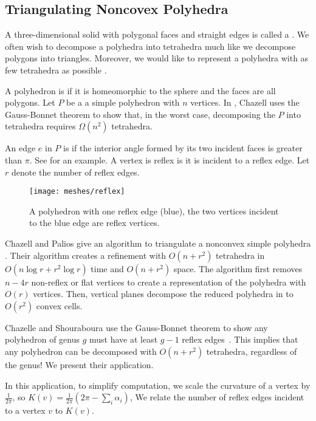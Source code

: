 \subsection{Triangulating Noncovex Polyhedra}
\label{sec:triangulating}

A three-dimensional solid with polygonal faces and straight edges is called a . 
We often wish to decompose a polyhedra into tetrahedra much like
we decompose polygons into triangles.
Moreover, we would like to represent a polyhedra
with as few tetrahedra as possible \cite{simplify-mesh-1999}.

A polyhedron is  if it is homeomorphic to the sphere 
and the faces are all polygons.
Let $P$ be a a simple polyhedron with $n$  vertices.
In \cite{chazelle-lower-1984}, Chazell uses the Gauss-Bonnet
theorem to show that,
in the worst case, decomposing the $P$
 into tetrahedra requires $\Omega(n^2)$ tetrahedra.

 An edge $e$ in $P$ is
 if the interior angle formed by its two incident faces
is greater than $\pi$. See  for an example.
A vertex is reflex is it is incident to a reflex edge.
Let $r$ denote the number of reflex edges.


\begin{figure}[htb]
\centering
	\texttt{[image: meshes/reflex]}
	\caption{A polyhedron with one reflex edge (blue), the two vertices incident to the blue
	edge are reflex vertices.}
\label{fig:reflex}
\end{figure}

Chazell and Palios give an
algorithm to triangulate a nonconvex simple polyhedra \cite{triangulating-polytope-1990}.
 Their algorithm creates a refinement with $O(n+r^2)$ tetrahedra
in $O(n\log r +r^2\log r)$ time and $O(n+r^2)$ space.
The algorithm first removes $n-4r$ non-reflex or flat vertices
to create a representation of the polyhedra with $O(r)$ vertices.
Then, vertical planes decompose the reduced polyhedra in to
$O(r^2)$ convex cells.

Chazelle and Shouraboura use the Gauss-Bonnet theorem to show any polyhedron
 of genus $g$ must have at least $g-1$ reflex edges~\cite{tetra-bounds-c-s-1994}.
 This implies that any polyhedron
can be decomposed with $O(n+r^2)$ tetrahedra, regardless  of 
the genus!  We present their application.

In this application, to simplify computation, we scale the curvature of a vertex
by $\frac{1}{2\pi}$, so $K(v)=\frac{1}{2\pi}\left(2\pi-\sum_i \alpha_i\right)$,
We relate the number of reflex edges incident to a vertex $v$ to $K(v)$.

